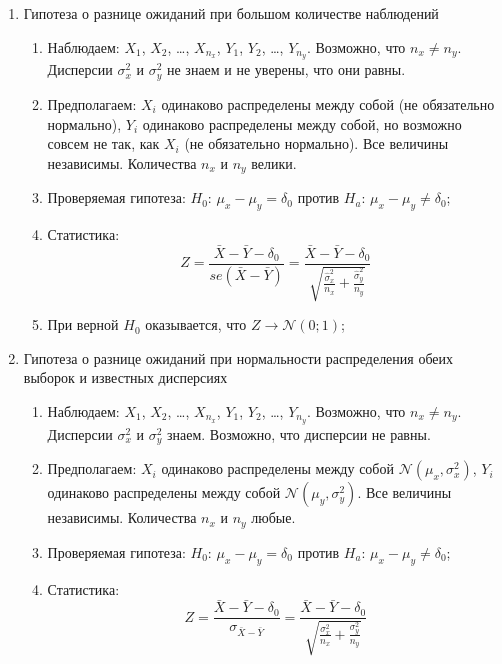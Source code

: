 \documentclass[12pt, a4paper]{article}
\newcommand{\cN}{\mathcal{N}}
\begin{document}
\begin{enumerate}[resume]
  \item Гипотеза о разнице ожиданий при большом количестве наблюдений
    \begin{enumerate}
      \item Наблюдаем: $X_1$, $X_2$, \ldots, $X_{n_x}$, $Y_1$, $Y_2$, \ldots, $Y_{n_y}$.
	Возможно, что $n_x \neq n_y$. Дисперсии $\sigma^2_x$ и $\sigma^2_y$ не знаем и не уверены, что они равны.
      \item Предполагаем: $X_i$ одинаково распределены между собой (не обязательно нормально),
	$Y_i$ одинаково распределены между собой, но возможно совсем не так, как $X_i$ (не обязательно нормально).
	Все величины независимы. Количества $n_x$ и $n_y$ велики.
      \item Проверяемая гипотеза: $H_0$: $\mu_x - \mu_y = \delta_0$ против $H_a$: $\mu_x - \mu_y \neq \delta_0$;

     \item Статистика:
	\[
	  Z = \frac{\bar X - \bar Y - \delta_0}{se(\bar X - \bar Y)} =
	  \frac{\bar X - \bar Y - \delta_0}{\sqrt{\frac{\hat \sigma^2_x}{n_x}+\frac{\hat\sigma^2_y}{n_y}}}
      \]

    \item При верной $H_0$ оказывается, что $Z \to \cN(0;1)$;
\end{enumerate}

  \item Гипотеза о разнице ожиданий при нормальности распределения обеих выборок и известных дисперсиях
    \begin{enumerate}
      \item Наблюдаем: $X_1$, $X_2$, \ldots, $X_{n_x}$, $Y_1$, $Y_2$, \ldots, $Y_{n_y}$.
	Возможно, что $n_x \neq n_y$. Дисперсии $\sigma^2_x$ и $\sigma^2_y$ знаем. Возможно, что дисперсии не равны.
      \item Предполагаем: $X_i$ одинаково распределены между собой $\cN(\mu_x, \sigma^2_x)$,
	$Y_i$ одинаково распределены между собой $\cN(\mu_y, \sigma^2_y)$.
	Все величины независимы. Количества $n_x$ и $n_y$ любые.
      \item Проверяемая гипотеза: $H_0$: $\mu_x - \mu_y = \delta_0$ против $H_a$: $\mu_x - \mu_y \neq \delta_0$;

     \item Статистика:
	\[
	  Z = \frac{\bar X - \bar Y - \delta_0}{\sigma_{\bar X - \bar Y}} =
	  \frac{\bar X - \bar Y - \delta_0}{\sqrt{\frac{\sigma^2_x}{n_x}+\frac{\sigma^2_y}{n_y}}}
      \]


\end{enumerate}
\end{enumerate}
\end{document}
